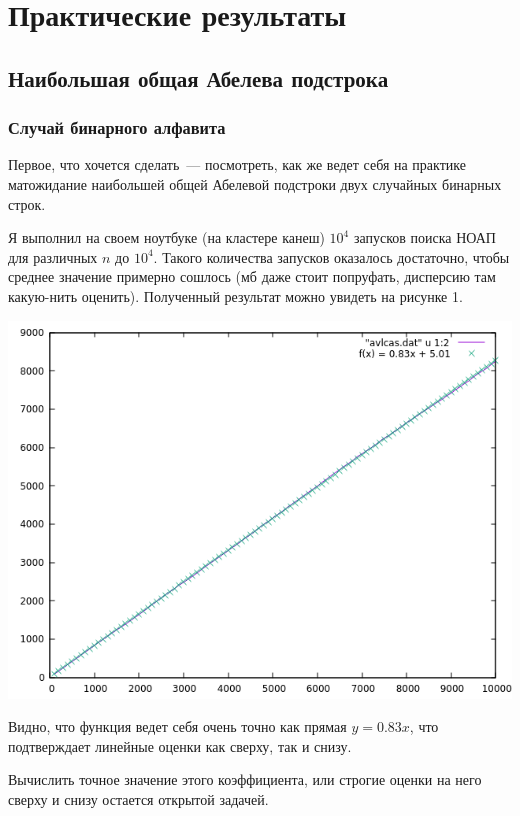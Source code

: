 \chapter{Практические результаты}
\section{Наибольшая общая Абелева подстрока}
\subsection{Случай бинарного алфавита}

Первое, что хочется сделать~--- посмотреть, как же ведет себя на практике матожидание наибольшей общей Абелевой подстроки двух случайных бинарных строк. 

Я выполнил на своем ноутбуке (на кластере канеш) $10^4$ запусков поиска НОАП для различных $n$ до $10^4$. Такого количества запусков оказалось достаточно, чтобы среднее значение примерно сошлось (мб даже стоит попруфать, дисперсию там какую-нить оценить). Полученный результат можно увидеть на рисунке 1.

\includegraphics{pics/avlcas.png}

Видно, что функция ведет себя очень точно как прямая $y=0.83x$, что подтверждает линейные оценки как сверху, так и снизу.

Вычислить точное значение этого коэффициента, или строгие оценки на него сверху и снизу остается открытой задачей. 


